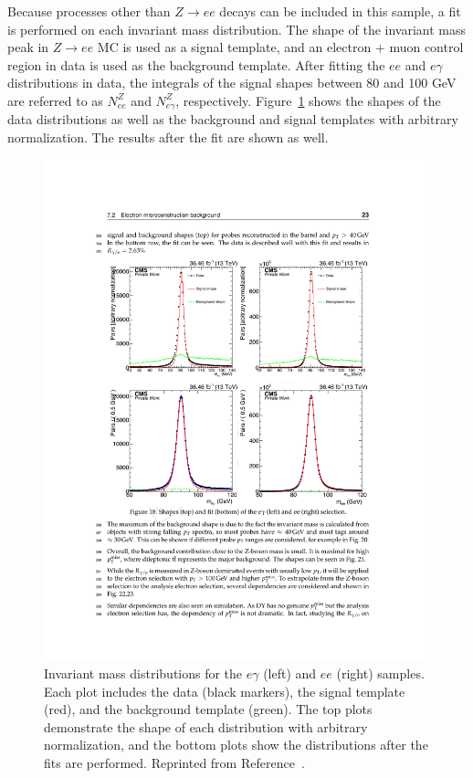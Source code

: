 Because processes other than $Z\rightarrow ee$ decays can be included in this sample, a fit is performed on each invariant mass distribution. The shape of the invariant mass peak in $Z\rightarrow ee$ MC is used as a signal template, and an electron + muon control region in data is used as the background template. After fitting the $ee$ and $e\gamma$ distributions in data, the integrals of the signal shapes between 80 and 100 GeV are referred to as $N_{ee}^Z$ and $N_{e\gamma}^Z$, respectively. 
Figure~\ref{fig:invMassShapes} shows the shapes of the data distributions as well as the background and signal templates with arbitrary normalization. The results after the fit are shown as well. 

\begin{figure}[h]
\begin{center}
\includegraphics[width=\textwidth]{Figures/DataAnalysis/EWKInvMassShapes.pdf}
\end{center}
\caption{Invariant mass distributions for the $e\gamma$ (left) and $ee$ (right) samples. Each plot includes the data (black markers), 
the signal template (red), and the background template (green). The top plots demonstrate the shape of each distribution with arbitrary 
normalization, and the bottom plots show the distributions after the fits are performed. Reprinted from Reference~\cite{KnutAN}.
}
\label{fig:invMassShapes}
\end{figure}

